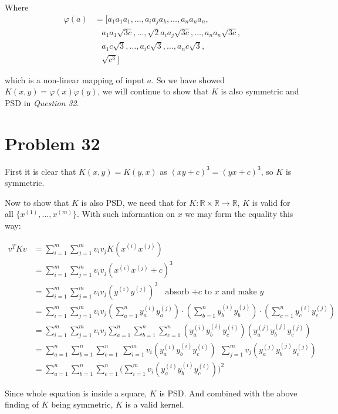 \documentclass[12pt]{article}
\newcommand{\vphi}{\varphi}
\begin{document}
Where
\begin{align*}
    \vphi(a) &= [a_1 a_1 a_1, \dots, a_i a_j a_k, \dots, a_n a_n a_n, \\
    &\ \ \ \  a_1 a_1 \sqrt{3c}, \dots,\sqrt{2}  a_i a_j \sqrt{3c}, \dots, a_n a_n \sqrt{3c},\\
    &\ \ \ \  a_1 c\sqrt{3}, \dots,  a_i c\sqrt{3}, \dots, a_n c\sqrt{3}, \\
    &\ \ \ \  \sqrt{c^3} ]
\end{align*}

which is a non-linear mapping of input $a$. So we have showed $K(x, y) = \vphi(x)\vphi(y)$, we will continue to show that $K$ is also symmetric and PSD in \textit{Question 32}.

\section{Problem 32}

First it is clear that $K (x, y) = K(y, x)$ as $(xy + c)^3 = (yx + c)^3$, so $K$ is symmetric.\newline

\noindent Now to show that $K$ is also PSD, we need that for $K: \mathbb{R} \times \mathbb{R} \rightarrow \mathbb{R}$, $K$ is valid for all $\{x^{(1)}, \dots, x^{(m)} \}$. With such information on $x$ we may form the equality this way:

\begin{align*}
    v^T K v &= \sum_{i=1}^{m} \sum_{j=1}^{m} v_i v_j K(x^{(i)} x^{(j)}) \\
    &= \sum_{i=1}^{m} \sum_{j=1}^{m} v_i v_j(x^{(i)} x^{(j)} + c)^3 \\
    &= \sum_{i=1}^{m} \sum_{j=1}^{m} v_i v_j(y^{(i)} y^{(j)} )^3 \ \ \ \ \text{absorb $+c$ to $x$ and make $y$} \\
    &= \sum_{i=1}^{m} \sum_{j=1}^{m} v_i v_j (\sum_{a = 1}^{n} y_{a}^{(i)} y_{a}^{(j)}) \cdot (\sum_{b = 1}^{n} y_{b}^{(i)} y_{b}^{(j)}) \cdot (\sum_{c = 1}^{n} y_{c}^{(i)} y_{c}^{(j)}) \\
    &= \sum_{i=1}^{m} \sum_{j=1}^{m} v_i v_j \sum_{a = 1}^{n} \sum_{b = 1}^{n} \sum_{c = 1}^{n} (y_{a}^{(i)} y_{b}^{(i)} y_{c}^{(i)}) (y_{a}^{(j)} y_{b}^{(j)} y_{c}^{(j)}) \\
    &= \sum_{a = 1}^{n} \sum_{b = 1}^{n} \sum_{c = 1}^{n} \ \sum_{i=1}^{m} v_i (y_{a}^{(i)} y_{b}^{(i)} y_{c}^{(i)}) \ \ \sum_{j=1}^{m} v_j (y_{a}^{(j)} y_{b}^{(j)} y_{c}^{(j)}) \\
    &= \sum_{a = 1}^{n} \sum_{b = 1}^{n} \sum_{c = 1}^{n} \big(\sum_{i=1}^{m} v_i (y_{a}^{(i)} y_{b}^{(i)} y_{c}^{(i)})\big)^2
\end{align*}

Since whole equation is inside a square, $K$ is PSD. And combined with the above finding of $K$ being symmetric, $K$ is a valid kernel.
\end{document}
